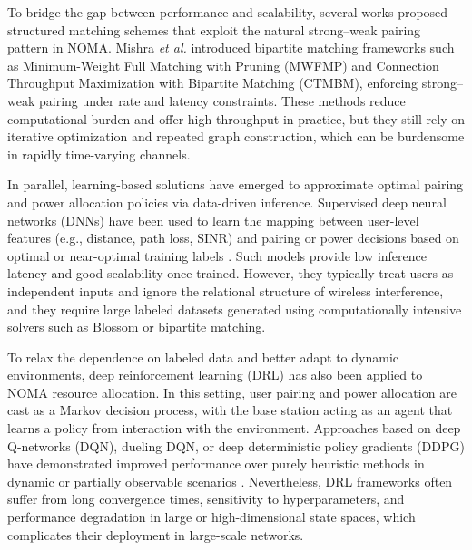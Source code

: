 \documentclass[conference]{IEEEtran}
\begin{document}
To bridge the gap between performance and scalability, several works proposed structured matching schemes that exploit the natural strong–weak pairing pattern in NOMA. Mishra \textit{et al.} \cite{mishra2021maximizing,mishra2022connection,mishra2023globecom} introduced bipartite matching frameworks such as Minimum-Weight Full Matching with Pruning (MWFMP) and Connection Throughput Maximization with Bipartite Matching (CTMBM), enforcing strong–weak pairing under rate and latency constraints. These methods reduce computational burden and offer high throughput in practice, but they still rely on iterative optimization and repeated graph construction, which can be burdensome in rapidly time-varying channels.

In parallel, learning-based solutions have emerged to approximate optimal pairing and power allocation policies via data-driven inference. Supervised deep neural networks (DNNs) have been used to learn the mapping between user-level features (e.g., distance, path loss, SINR) and pairing or power decisions based on optimal or near-optimal training labels \cite{sun2018learning,he2020learning,eisen2020optimal}. Such models provide low inference latency and good scalability once trained. However, they typically treat users as independent inputs and ignore the relational structure of wireless interference, and they require large labeled datasets generated using computationally intensive solvers such as Blossom or bipartite matching.

To relax the dependence on labeled data and better adapt to dynamic environments, deep reinforcement learning (DRL) has also been applied to NOMA resource allocation. In this setting, user pairing and power allocation are cast as a Markov decision process, with the base station acting as an agent that learns a policy from interaction with the environment. Approaches based on deep Q-networks (DQN), dueling DQN, or deep deterministic policy gradients (DDPG) have demonstrated improved performance over purely heuristic methods in dynamic or partially observable scenarios \cite{jiang2021,hamedoon2024}. Nevertheless, DRL frameworks often suffer from long convergence times, sensitivity to hyperparameters, and performance degradation in large or high-dimensional state spaces, which complicates their deployment in large-scale networks.
\end{document}
